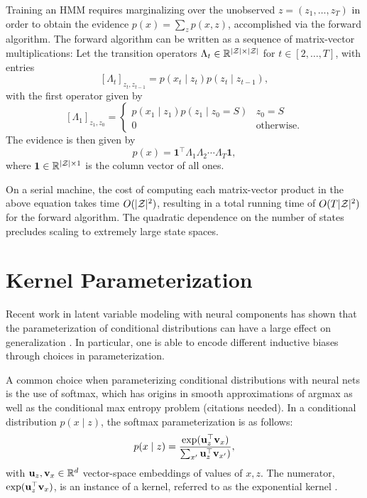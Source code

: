\documentclass{article}
\begin{document}
Training an HMM requires marginalizing over the unobserved
$z = (z_1,\ldots,z_T)$ in order to obtain the evidence $p(x) = \sum_z p(x,z)$,
accomplished via the forward algorithm.
The forward algorithm can be written as a sequence of matrix-vector multiplications:
Let the transition operators $\Lambda_t\in\mathbb{R}^{|\mathcal{Z}|\times|\mathcal{Z}|}$ for $t\in[2,\ldots,T]$, 
with entries $$[\Lambda_t]_{z_t,z_{t-1}} = p(x_t\mid z_t)p(z_t\mid z_{t-1}),$$
with the first operator given by
$$[\Lambda_1]_{z_1,z_0} = \begin{cases}
p(x_1 \mid z_1) p(z_1 \mid z_0=S) & z_0 = S\\
0 & \textrm{otherwise}.
\end{cases}
$$
The evidence is then given by
\begin{equation}
p(x) = \mathbf{1}^\top\Lambda_1\Lambda_2\cdots\Lambda_T\mathbf{1},
\end{equation}
where $\mathbf{1}\in\mathbb{R}^{|\mathcal{Z}|\times1}$ is the column vector of all ones.

On a serial machine, the cost of computing each matrix-vector product in
the above equation takes time $O(|\mathcal{Z}|^2)$, resulting in a total
running time of $O(T|\mathcal{Z}|^2)$ for the forward algorithm.
The quadratic dependence on the number of states precludes
scaling to extremely large state spaces.

\section{Kernel Parameterization}
Recent work in latent variable modeling with neural components has shown
that the parameterization of conditional distributions can have a large
effect on generalization \citep{kim2019cpcfg}. 
In particular, one is able to encode different inductive biases through choices in
parameterization.

A common choice when parameterizing conditional distributions with
neural nets is the use of softmax, which has origins in smooth
approximations of argmax as well as the conditional max entropy problem (citations needed).
In a conditional distribution $p(x \mid z)$, the softmax parameterization is as follows: 
$$p(x \mid z) = \frac{\exp(\mathbf{u}_z^\top \mathbf{v}_x)}{\sum_{x'} \mathbf{u}_z^\top \mathbf{v}_{x'})},$$
with $\mathbf{u}_z,\mathbf{v}_x\in\mathbb{R}^d$ vector-space embeddings of values of $x,z$.
The numerator, $\exp(\mathbf{u}_z^\top \mathbf{v}_x)$, is an instance of a kernel,
referred to as the exponential kernel \citep{rawat2019sampledsoftmax}.
\end{document}
